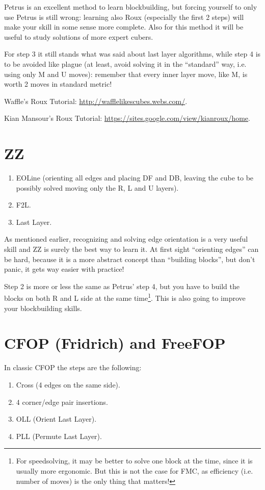 \documentclass[11pt,a4paper]{book}
\begin{document}
Petrus is an excellent method to learn blockbuilding, but forcing yourself to only use Petrus is still wrong: learning also Roux (especially the first 2 steps) will make your skill in some sense more complete. Also for this method it will be useful to study solutions of more expert cubers.

For step 3 it still stands what was said about last layer algorithms, while step 4 is to be avoided like plague (at least, avoid solving it in the ``standard'' way, i.e. using only M and U moves): remember that every inner layer move, like M, is worth 2 moves in standard metric!

Waffle's Roux Tutorial: \url{http://wafflelikescubes.webs.com/}.

Kian Mansour's Roux Tutorial: \url{https://sites.google.com/view/kianroux/home}.

\section{ZZ}
\begin{enumerate}
\item EOLine (orienting all edges and placing DF and DB, leaving the cube to be possibly solved moving only the R, L and U layers).
\item F2L.
\item Last Layer.
\end{enumerate}

As mentioned earlier, recognizing and solving edge orientation is a very useful skill and ZZ is surely the best way to learn it. At first sight ``orienting edges'' can be hard, because it is a more abstract concept than ``building blocks'', but don't panic, it gets way easier with practice!

Step 2 is more or less the same as Petrus' step 4, but you have to build the blocks on both R and L side at the same time\footnote{For speedsolving, it may be better to solve one block at the time, since it is usually more ergonomic. But this is not the case for FMC, as efficiency (i.e. number of moves) is the only thing that matters!}. This is also going to improve your blockbuilding skills.

\section{CFOP (Fridrich) and FreeFOP}
In classic CFOP the steps are the following:
\begin{enumerate}
\item Cross (4 edges on the same side).
\item 4 corner/edge pair insertions.
\item OLL (Orient Last Layer).
\item PLL (Permute Last Layer).
\end{enumerate}
\end{document}
